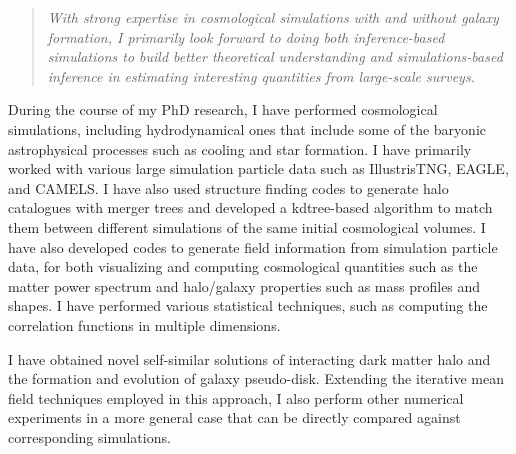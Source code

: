\documentclass[10pt]{article}
\begin{document}
\begin{quote}
    \textit{With strong expertise in cosmological simulations with and without galaxy formation, I primarily look forward to doing both inference-based simulations to build better theoretical understanding and simulations-based inference in estimating interesting quantities from large-scale surveys.}
\end{quote}

During the course of my PhD research, I have performed cosmological simulations, including hydrodynamical ones that include some of the baryonic astrophysical processes such as cooling and star formation. I have primarily worked with various large simulation particle data such as IllustrisTNG, EAGLE, and CAMELS. I have also used structure finding codes to generate halo catalogues with merger trees and developed a kdtree-based algorithm to match them between different simulations of the same initial cosmological volumes. I have also developed codes to generate field information from simulation particle data, for both visualizing and computing cosmological quantities such as the matter power spectrum and halo/galaxy properties such as mass profiles and shapes. I have performed various statistical techniques, such as computing the correlation functions in multiple dimensions. 

I have obtained novel self-similar solutions of interacting dark matter halo and the formation and evolution of galaxy pseudo-disk. Extending the iterative mean field techniques employed in this approach, I also perform other numerical experiments in a more general case that can be directly compared against corresponding simulations.



\end{document}
